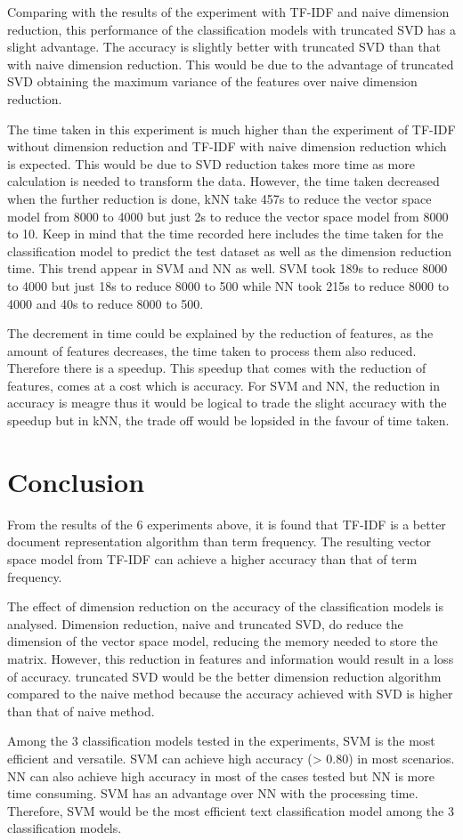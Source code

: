 Comparing with the results of the experiment with TF-IDF and naive dimension reduction, this performance of the classification models with truncated SVD has a slight advantage. The accuracy is slightly better with truncated SVD than that with naive dimension reduction. This would be due to the advantage of truncated SVD obtaining the maximum variance of the features over naive dimension reduction.

The time taken in this experiment is much higher than the experiment of TF-IDF without dimension reduction and TF-IDF with naive dimension reduction which is expected. This would be due to SVD reduction takes more time as more calculation is needed to transform the data. However, the time taken decreased when the further reduction is done, kNN take 457s to reduce the vector space model from 8000 to 4000 but just 2s to reduce the vector space model from 8000 to 10. Keep in mind that the time recorded here includes the time taken for the classification model to predict the test dataset as well as the dimension reduction time. This trend appear in SVM and NN as well. SVM took 189s to reduce 8000 to 4000 but just 18s to reduce 8000 to 500 while NN took 215s to reduce 8000 to 4000 and 40s to reduce 8000 to 500. 

The decrement in time could be explained by the reduction of features, as the amount of features decreases, the time taken to process them also reduced. Therefore there is a speedup. This speedup that comes with the reduction of features, comes at a cost which is accuracy. For SVM and NN, the reduction in accuracy is meagre thus it would be logical to trade the slight accuracy with the speedup but in kNN, the trade off would be lopsided in the favour of time taken.\\

\clearpage
\section{Conclusion}
From the results of the 6 experiments above, it is found that TF-IDF is a better document representation algorithm than term frequency. The resulting vector space model from TF-IDF can achieve a higher accuracy than that of term frequency. 

The effect of dimension reduction on the accuracy of the classification models is analysed. Dimension reduction, naive and truncated SVD, do reduce the dimension of the vector space model, reducing the memory needed to store the matrix. However, this reduction in features and information would result in a loss of accuracy. truncated SVD would be the better dimension reduction algorithm compared to the naive method because the accuracy achieved with SVD is higher than that of naive method.

Among the 3 classification models tested in the experiments, SVM is the most efficient and versatile. SVM can achieve high accuracy (> 0.80) in most scenarios. NN can also achieve high accuracy in most of the cases tested but NN is more time consuming. SVM has an advantage over NN with the processing time. Therefore, SVM would be the most efficient text classification model among the 3 classification models.


